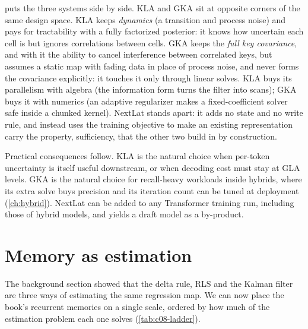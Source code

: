  puts the three systems side by side. KLA and GKA sit at opposite corners of
the same design space. KLA keeps \emph{dynamics} (a transition and process noise) and pays for
tractability with a fully factorized posterior: it knows how uncertain each cell is but ignores
correlations between cells. GKA keeps the \emph{full key covariance}, and with it the ability to
cancel interference between correlated keys, but assumes a static map with fading data in place of
process noise, and never forms the covariance explicitly: it touches it only through linear solves.
KLA buys its parallelism with algebra (the information form turns the filter into scans); GKA buys
it with numerics (an adaptive regularizer makes a fixed-coefficient solver safe inside a chunked
kernel). NextLat stands apart: it adds no state and no write rule, and instead uses the training
objective to make an existing representation carry the property, sufficiency, that the other two
build in by construction.

Practical consequences follow. KLA is the natural choice when per-token uncertainty is itself
useful downstream, or when decoding cost must stay at GLA levels. GKA is the natural choice for
recall-heavy workloads inside hybrids, where its extra solve buys precision and its iteration count
can be tuned at deployment (\cref{ch:hybrid}). NextLat can be added to any Transformer training run,
including those of hybrid models, and yields a draft model as a by-product.

\section{Memory as estimation}\label{sec:c08-estimation}

The background section showed that the delta rule, RLS and the Kalman filter are three ways of
estimating the same regression map. We can now place the book's recurrent memories on a single
scale, ordered by how much of the estimation problem each one solves (\cref{tab:c08-ladder}).

